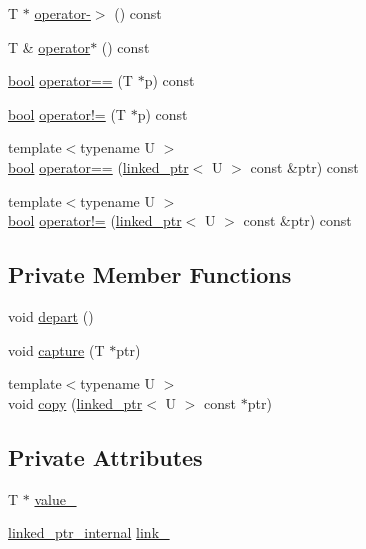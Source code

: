 \begin{DoxyCompactItemize}
\item 
T $\ast$ \hyperlink{classtesting_1_1internal_1_1linked__ptr_a23ff85ac97eed03e945034b65c8eb900}{operator-\/$>$} () const
\item 
T \& \hyperlink{classtesting_1_1internal_1_1linked__ptr_ac94ad266bf41cbf979a95ca2870908d9}{operator$\ast$} () const
\item 
\hyperlink{classbool}{bool} \hyperlink{classtesting_1_1internal_1_1linked__ptr_ad87ac8ff5543b6fad66e2f3c9844581a}{operator==} (T $\ast$p) const
\item 
\hyperlink{classbool}{bool} \hyperlink{classtesting_1_1internal_1_1linked__ptr_a10305395af92bd2fec7bca085cabc99c}{operator!=} (T $\ast$p) const
\item 
{\footnotesize template$<$typename U $>$ }\\\hyperlink{classbool}{bool} \hyperlink{classtesting_1_1internal_1_1linked__ptr_a79306e959a4ae7b3a9da641d2ba06ce6}{operator==} (\hyperlink{classtesting_1_1internal_1_1linked__ptr}{linked\+\_\+ptr}$<$ U $>$ const \&ptr) const
\item 
{\footnotesize template$<$typename U $>$ }\\\hyperlink{classbool}{bool} \hyperlink{classtesting_1_1internal_1_1linked__ptr_a4801114a83a9e12b08f90e0d28318f26}{operator!=} (\hyperlink{classtesting_1_1internal_1_1linked__ptr}{linked\+\_\+ptr}$<$ U $>$ const \&ptr) const
\end{DoxyCompactItemize}
\subsection*{Private Member Functions}
\begin{DoxyCompactItemize}
\item 
void \hyperlink{classtesting_1_1internal_1_1linked__ptr_a0852ab20839140f29b2ad074339fccc7}{depart} ()
\item 
void \hyperlink{classtesting_1_1internal_1_1linked__ptr_a0b4623795339fd29bf9303f926ae2824}{capture} (T $\ast$ptr)
\item 
{\footnotesize template$<$typename U $>$ }\\void \hyperlink{classtesting_1_1internal_1_1linked__ptr_aea2859970b65708fc4f7c8c4cbc7928a}{copy} (\hyperlink{classtesting_1_1internal_1_1linked__ptr}{linked\+\_\+ptr}$<$ U $>$ const $\ast$ptr)
\end{DoxyCompactItemize}
\subsection*{Private Attributes}
\begin{DoxyCompactItemize}
\item 
T $\ast$ \hyperlink{classtesting_1_1internal_1_1linked__ptr_abb52c4e944fc7a24a4ec7788b612fb37}{value\+\_\+}
\item 
\hyperlink{classtesting_1_1internal_1_1linked__ptr__internal}{linked\+\_\+ptr\+\_\+internal} \hyperlink{classtesting_1_1internal_1_1linked__ptr_a8fdfa75fea8bfc10825a3cc53c50461f}{link\+\_\+}
\end{DoxyCompactItemize}
